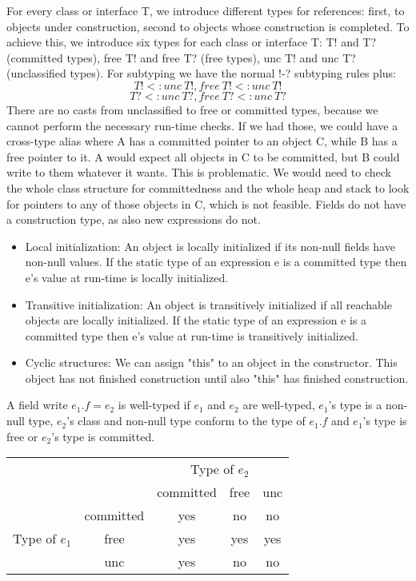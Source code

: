 \begin{mytitle} For every class or interface T, we introduce different types for references: first, to objects under construction, second to objects whose construction is completed. To achieve this, we introduce six types for each class or interface T: T! and T? (committed types), free T!  and free T? (free types), unc T! and unc T? (unclassified types). For subtyping we have the normal !-? subtyping rules plus:
    $$T! <: unc\ T!, free\ T! <: unc\ T!$$
    $$T? <: unc\ T?, free\ T? <: unc\ T?$$
There are no casts from unclassified to free or committed types, because we cannot perform the necessary run-time checks. If we had those, we could have a cross-type alias where A has a committed pointer to an object C, while B has a free pointer to it. A would expect all objects in C to be committed, but B could write to them whatever it wants. This is problematic. We would need to check the whole class structure for committedness and the whole heap and stack to look for pointers to any of those objects in C, which is not feasible.
Fields do not have a construction type, as also new expressions do not.
\end{mytitle}
\begin{mytitle}[Requirements]\hfill
\begin{itemize}
    \item Local initialization: An object is locally initialized if its non-null fields have non-null values. If the static type of an expression e is a committed type then e's value at run-time is locally initialized. 
    \item Transitive initialization: An object is transitively initialized if all reachable objects are locally initialized. If the static type of an expression e is a committed type then e's value at run-time is transitively initialized.
    \item Cyclic structures: We can assign "this" to an object in the constructor. This object has not finished construction until also "this" has finished construction.
\end{itemize}
\end{mytitle}
\begin{mytitle} A field write $e_1.f = e_2$ is well-typed if $e_1$ and $e_2$ are well-typed, $e_1$'s type is a non-null type, $e_2$'s class and non-null type conform to the type of $e_1.f$ and $e_1$'s type is free or $e_2$'s type is committed.
\begin{center}
\begin{tabular}{c c|c c c}
    & & \multicolumn{3}{c}{Type of $e_2$}\\
     & & committed & free & unc \\
    \hline
    \multirow{3}{*}{Type of $e_1$} & committed & yes & no & no\\
    & free & yes & yes & yes\\
    & unc & yes & no & no\\
\end{tabular}
\end{center}
\end{mytitle}
